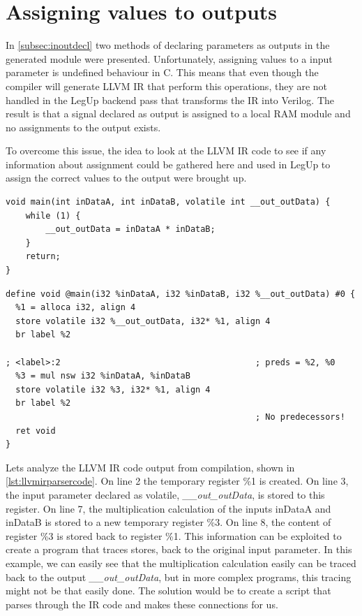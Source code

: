\section{\label{sec:assValueToOutput}Assigning values to outputs}
In \cref{subsec:inoutdecl} two methods of declaring parameters as outputs in the generated module were presented. Unfortunately, assigning values to a input parameter is undefined behaviour in C. This means that even though the compiler will generate LLVM IR that perform this operations, they are not handled in the LegUp backend pass that transforms the IR into Verilog. The result is that a signal declared as output is assigned to a local RAM module and no assignments to the output exists.

To overcome this issue, the idea to look at the LLVM IR code to see if any information about assignment could be gathered here and used in LegUp to assign the correct values to the output were brought up. 
\lstset{language=C,style=Cstyle}
\begin{lstlisting}[caption={Simple C-code example for LLVM IR parsing},label=lst:cllvmirparsercode]
void main(int inDataA, int inDataB, volatile int __out_outData) {
    while (1) {
        __out_outData = inDataA * inDataB;
    }
    return;
}
\end{lstlisting}
\lstset{language=LLVM,style=LLVMStyle}
\begin{lstlisting}[caption={LLVM IR code for simple parsing example},label=lst:llvmirparsercode]
define void @main(i32 %inDataA, i32 %inDataB, i32 %__out_outData) #0 {
  %1 = alloca i32, align 4
  store volatile i32 %__out_outData, i32* %1, align 4
  br label %2

; <label>:2                                       ; preds = %2, %0
  %3 = mul nsw i32 %inDataA, %inDataB
  store volatile i32 %3, i32* %1, align 4
  br label %2
                                                  ; No predecessors!
  ret void
}
\end{lstlisting}
Lets analyze the LLVM IR code output from compilation, shown in \cref{lst:llvmirparsercode}. On line 2 the temporary register \%1 is created. On line 3, the input parameter declared as volatile, \textit{\_\_out\_outData}, is stored to this register. On line 7, the multiplication calculation of the inputs inDataA and inDataB is stored to a new temporary register \%3. On line 8, the content of register \%3 is stored back to register \%1. This information can be exploited to create a program that traces stores, back to the original input parameter. In this example, we can easily see that the multiplication calculation easily can be traced back to the output \textit{\_\_out\_outData}, but in more complex programs, this tracing might not be that easily done. The solution would be to create a script that parses through the IR code and makes these connections for us. 

